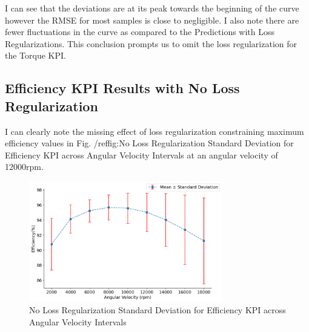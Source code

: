 \documentclass{report} %
\begin{document}
I can see that the deviations are at its peak towards the beginning of the curve however the \ac{RMSE} for most samples is close to negligible.
I also note there are fewer fluctuations in the curve as compared to the Predictions with Loss Regularizations.
This conclusion prompts us to omit the loss regularization for the Torque \ac{KPI}.

\subsection{Efficiency KPI Results with No Loss Regularization}\label{subsec:Efficiency Results with No Loss Regularization}

I can clearly note the missing effect of loss regularization constraining maximum efficiency values in Fig. 
/ref{fig:No Loss Regularization Standard Deviation for Efficiency KPI across Angular Velocity Intervals} at an angular velocity of 12000rpm.

\begin{figure}[H]
    \centering
    \includegraphics[width=0.75\textwidth]{./ReportImages/stddev_y2_nn_no_lossreg_MLP.png} 
    \caption{No Loss Regularization Standard Deviation for Efficiency \ac{KPI} across Angular Velocity Intervals}
    \label{fig:No Loss Regularization Standard Deviation for Efficiency KPI across Angular Velocity Intervals}
\end{figure}
\end{document}
